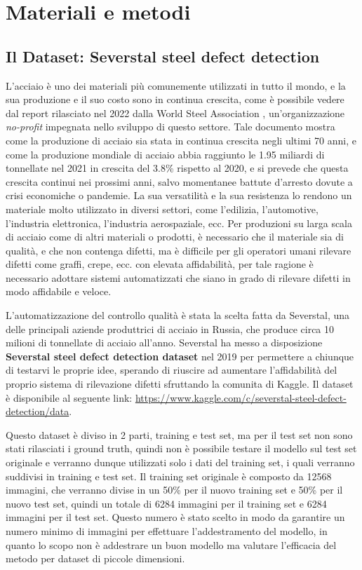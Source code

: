 \chapter{Materiali e metodi\ok \ok \ok}

\section{Il Dataset: Severstal steel defect detection \ok}

L'acciaio è uno dei materiali più comunemente utilizzati in tutto il mondo, e la sua produzione e il suo costo sono in continua crescita, come è possibile vedere
dal report rilasciato nel 2022 dalla World Steel Association \cite{worldsteelreport2021}, un'organizzazione \textit{no-profit} impegnata 
nello sviluppo di questo settore.
Tale documento mostra come la produzione di acciaio sia stata in continua crescita negli ultimi 70 anni, e come la produzione mondiale di acciaio
abbia raggiunto le 1.95 miliardi di tonnellate nel 2021 in crescita del 3.8\% rispetto al 2020, e si prevede che questa crescita continui nei prossimi anni, 
salvo momentanee battute d'arresto dovute a crisi economiche o pandemie.
La sua versatilità e la sua resistenza lo rendono un materiale molto utilizzato in diversi settori, come l'edilizia, l'automotive, l'industria elettronica, l'industria aerospaziale, ecc.
Per produzioni su larga scala di acciaio come di altri materiali o prodotti, è necessario che il materiale sia di qualità, e che non contenga difetti,
ma è difficile per gli operatori umani rilevare difetti come graffi, crepe, ecc. con elevata affidabilità, per tale ragione 
è necessario adottare sistemi automatizzati che siano in grado di rilevare difetti in modo affidabile e veloce.

L'automatizzazione del controllo qualità è stata la scelta fatta da Severstal, una delle principali aziende produttrici di acciaio in Russia, che produce circa 10 milioni di tonnellate di acciaio 
all'anno. Severstal ha messo a disposizione \textbf{Severstal steel defect detection dataset} nel 2019 per permettere a chiunque di testarvi le proprie idee, 
sperando di riuscire ad aumentare l'affidabilità del proprio sistema di rilevazione difetti sfruttando la comunita di Kaggle.
Il dataset è disponibile al seguente link: \url{https://www.kaggle.com/c/severstal-steel-defect-detection/data}.

Questo dataset è diviso in 2 parti, training e test set, ma per il test set non sono stati rilasciati i ground truth, quindi non è possibile testare
il modello sul test set originale e verranno dunque utilizzati solo i dati del training set, i quali verranno suddivisi in training e test set.
Il training set originale  è composto da 12568 immagini, che verranno divise in un 50\% per il nuovo training set e 50\% per il nuovo test set, 
quindi un totale di 6284 immagini per il training set e 6284 immagini per il test set. 
Questo numero è stato scelto in modo da garantire un numero minimo di immagini per effettuare l'addestramento del modello, in quanto 
lo scopo non è addestrare un buon modello ma valutare l'efficacia del metodo per dataset di piccole dimensioni. 

